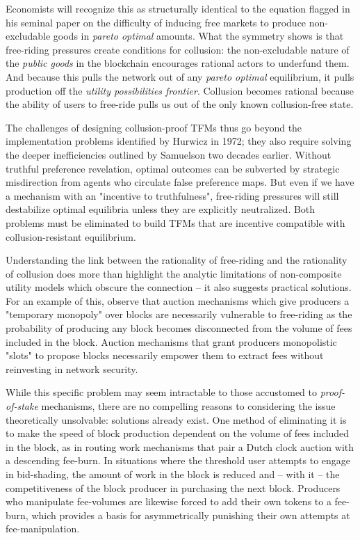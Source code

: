 \documentclass[oneside]{article}   	%
\begin{document}
Economists will recognize this as structurally identical to the equation \cite{samuelson1954pure} flagged in his seminal paper on the difficulty of inducing free markets to produce non-excludable goods in \textit{pareto optimal} amounts. What the symmetry shows is that free-riding pressures create conditions for collusion: the non-excludable nature of the \textit{public goods} in the blockchain encourages rational actors to underfund them. And because this pulls the network out of any \textit{pareto optimal} equilibrium, it pulls production off the \textit{utility possibilities frontier}. Collusion becomes rational because the ability of users to free-ride pulls us out of the only known collusion-free state.

The challenges of designing collusion-proof TFMs thus go beyond the implementation problems identified by Hurwicz in 1972; they also require solving the deeper inefficiencies outlined by Samuelson two decades earlier. Without truthful preference revelation, optimal outcomes can be subverted by strategic misdirection from agents who circulate false preference maps. But even if we have a mechanism with an "incentive to truthfulness", free-riding pressures will still destabilize optimal equilibria unless they are explicitly neutralized. Both problems must be eliminated to build TFMs that are incentive compatible with collusion-resistant equilibrium.

Understanding the link between the rationality of free-riding and the rationality of collusion does more than highlight the analytic limitations of non-composite utility models which obscure the connection -- it also suggests practical solutions. For an example of this, observe that auction mechanisms which give producers a "temporary monopoly" over blocks are necessarily vulnerable to free-riding as the probability of producing any block becomes disconnected from the volume of fees included in the block. Auction mechanisms that grant producers monopolistic "slots" to propose blocks necessarily empower them to extract fees without reinvesting in network security.

While this specific problem may seem intractable to those accustomed to \textit{proof-of-stake} mechanisms, there are no compelling reasons to considering the issue theoretically unsolvable: solutions already exist. One method of eliminating it is to make the speed of block production dependent on the volume of fees included in the block, as in routing work mechanisms that pair a Dutch clock auction with a descending fee-burn. In situations where the threshold user attempts to engage in bid-shading, the amount of work in the block is reduced and -- with it -- the competitiveness of the block producer in purchasing the next block. Producers who manipulate fee-volumes are likewise forced to add their own tokens to a fee-burn, which provides a basis for asymmetrically punishing their own attempts at fee-manipulation.
\end{document}
